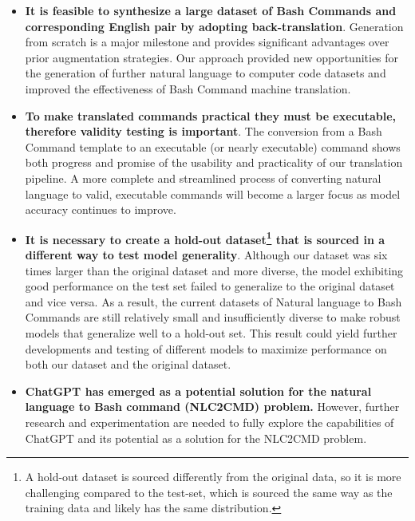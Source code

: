 \documentclass{river-journal}
\begin{document}
\begin{itemize}
\item {\bf It is feasible to synthesize a large dataset of Bash Commands and corresponding English pair by adopting back-translation}. Generation from scratch is a major milestone and provides significant advantages over prior augmentation strategies. Our approach provided new opportunities for the generation of further natural language to computer code datasets and improved the effectiveness of Bash Command machine translation. 

\item {\bf To make translated commands practical they must be executable, therefore validity testing is important}. The conversion from a Bash Command template to an executable (or nearly executable) command shows both progress and promise of the usability and practicality of our translation pipeline. A more complete and streamlined process of converting natural language to valid, executable commands will become a larger focus as model accuracy continues to improve. 

\item {\bf It is necessary to create a hold-out dataset\footnote{A hold-out dataset is sourced differently from the original data, so it is more challenging compared to the test-set, which is sourced the same way as the training data and likely has the same distribution.} that is sourced in a different way to test model generality}. Although our dataset was six times larger than the original dataset and more diverse, the model exhibiting good performance on the test set failed to generalize to the original dataset and vice versa. As a result, the current datasets of Natural language to Bash Commands are still relatively small and insufficiently diverse to make robust models that generalize well to a hold-out set. This result could yield further developments and testing of different models to maximize performance on both our dataset and the original dataset.

\item {\bf ChatGPT has emerged as a potential solution for the natural language to Bash command (NLC2CMD) problem.} However, further research and experimentation are needed to fully explore the capabilities of ChatGPT and its potential as a solution for the NLC2CMD problem.

\end{itemize}

 
\end{document}

